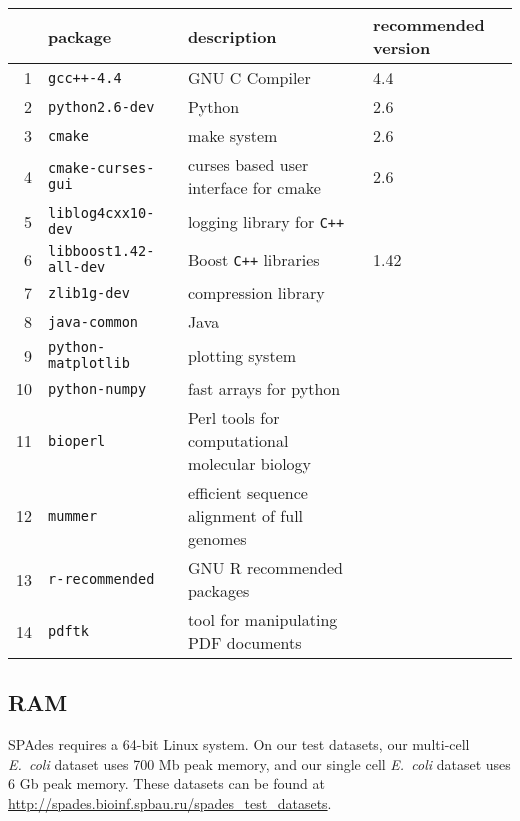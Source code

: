 \documentclass{article}
\def\spades{SPAdes}
\def\ecoli{\it E.~coli}
\begin{document}
\begin{center}
\begin{tabular}{rlll}
\toprule
& package & description & recommended version\\
\midrule
1 & {\tt gcc++-4.4} & GNU C Compiler & 4.4\\
2 & {\tt python2.6-dev} & Python & 2.6\\
3 & {\tt cmake} & make system & 2.6\\
4 & {\tt cmake-curses-gui} & curses based user interface for cmake & 2.6\\
5 & {\tt liblog4cxx10-dev} & logging library for {\tt C++} & \\
6 & {\tt libboost1.42-all-dev} & Boost {\tt C++} libraries & 1.42\\
7 & {\tt zlib1g-dev} & compression library & \\
8 & {\tt java-common} & Java &\\
9 & {\tt python-matplotlib} & plotting system & \\
10 & {\tt python-numpy} & fast arrays for python & \\
11 & {\tt bioperl} & Perl tools for computational molecular biology & \\
12 & {\tt mummer} & efficient sequence alignment of full genomes & \\
13 & {\tt r-recommended} & GNU R recommended packages & \\
14 & {\tt pdftk} & tool for manipulating PDF documents & \\
\bottomrule
\end{tabular}
\end{center}

\subsection{RAM}
{\spades} requires a 64-bit Linux system.
On our test datasets,
our multi-cell {\ecoli} dataset uses 700 Mb peak memory, and our single cell
{\ecoli} dataset uses 6 Gb peak memory. 
These datasets can be found at \url{http://spades.bioinf.spbau.ru/spades_test_datasets}.
\end{document}
